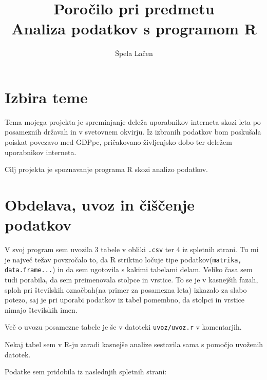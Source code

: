 \documentclass[11pt,a4paper]{article}
\begin{document}
\author{Špela Lačen}
\title{Poročilo pri predmetu \\
Analiza podatkov s programom R}
\maketitle

\section{Izbira teme}

Tema mojega projekta je spreminjanje deleža uporabnikov interneta skozi leta po posameznih državah in v svetovnem okvirju. Iz izbranih podatkov bom poskušala poiskat povezavo med  GDPpc, pričakovano življenjsko dobo ter deležem uporabnikov interneta. 

\bigskip 
Cilj projekta je spoznavanje programa R skozi analizo podatkov.



\section{Obdelava, uvoz in čiščenje podatkov}

V svoj program sem uvozila 3 tabele  v obliki \verb|.csv| ter 4 iz spletnih strani. Tu mi je največ težav povzročalo to, da R striktno ločuje tipe podatkov\-(\verb|matrika, data.frame...|) in da sem ugotovila s kakimi tabelami delam. Veliko časa sem tudi porabila, da sem preimenovala stolpce in vrstice. To se je v kasnejših fazah, sploh pri številskih označbah(na primer za posamezna leta) izkazalo za slabo potezo, saj je pri uporabi podatkov iz tabel pomembno, da stolpci in vrstice nimajo številskih imen. 

Več o uvozu posamezne tabele je še v datoteki \verb|uvoz/uvoz.r| v komentarjih. 

\smallskip
Nekaj tabel sem v R-ju zaradi kasnejše analize sestavila sama s pomočjo uvoženih datotek.

\bigskip
Podatke sem pridobila iz naslednjih spletnih strani:
\end{document}
